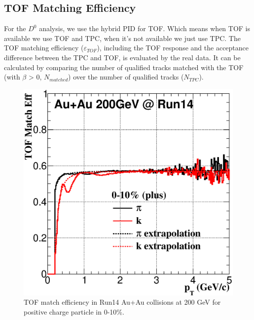\documentclass[a4paper]{article}
\begin{document}
\subsection{TOF Matching Efficiency}

For the $D^0$ analysis, we use the hybrid PID for TOF. Which means when TOF is available we use TOF and TPC, when it's not available we just use TPC. The TOF matching efficiency ($\varepsilon_{TOF}$), including the TOF response and the acceptance difference between the TPC and TOF, is evaluated by the real data. It can be calculated by comparing the number of qualified tracks matched with the TOF (with $\beta$ > 0, $N_{matched}$) over  the number of qualified tracks ($N_{TPC}$).

\begin{figure}[htbp]
\begin{minipage}[htbp]{0.52\linewidth}
\centering
\includegraphics[width=1.0\textwidth]{fig/tofMatchEff_Run14_Fit_cent1.eps}
\caption{TOF match efficiency in Run14 Au+Au collisions at 200 GeV for positive charge particle in 0-10\%. \label{fig:mtof010}}
\end{minipage}
\hfill
\begin{minipage}[htbp]{0.52\linewidth}
\centering

\end{minipage}
\end{figure}
\end{document}
